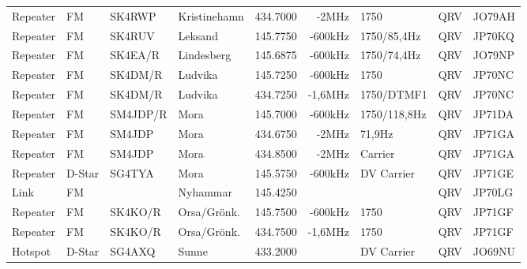 \documentclass[10pt,swedish,a4paper,twoside]{article}
\begin{document}
\begin{landscape}
\begin{longtable}{llllrrlcl}
	Repeater          & FM           & SK4RWP        & Kristinehamn        &          434.7000 &          -2MHz & 1750            &       QRV       & JO79AH           \\
	Repeater          & FM           & SK4RUV        & Leksand             &          145.7750 &        -600kHz & 1750/85,4Hz     &       QRV       & JP70KQ           \\
	Repeater          & FM           & SK4EA/R       & Lindesberg          &          145.6875 &        -600kHz & 1750/74,4Hz     &       QRV       & JO79NP           \\
	Repeater          & FM           & SK4DM/R       & Ludvika             &          145.7250 &        -600kHz & 1750            &       QRV       & JP70NC           \\
	Repeater          & FM           & SK4DM/R       & Ludvika             &          434.7250 &        -1,6MHz & 1750/DTMF1      &       QRV       & JP70NC           \\
	Repeater          & FM           & SM4JDP/R      & Mora                &          145.7000 &        -600kHz & 1750/118,8Hz    &       QRV       & JP71DA           \\
	Repeater          & FM           & SM4JDP        & Mora                &          434.6750 &          -2MHz & 71,9Hz          &       QRV       & JP71GA           \\
	Repeater          & FM           & SM4JDP        & Mora                &          434.8500 &          -2MHz & Carrier         &       QRV       & JP71GA           \\
	Repeater          & D-Star       & SG4TYA        & Mora                &          145.5750 &        -600kHz & DV Carrier      &       QRV       & JP71GE           \\
	Link              & FM           &               & Nyhammar            &          145.4250 &                &                 &       QRV       & JP70LG           \\
	Repeater          & FM           & SK4KO/R       & Orsa/Grönk.         &          145.7500 &        -600kHz & 1750            &       QRV       & JP71GF           \\
	Repeater          & FM           & SK4KO/R       & Orsa/Grönk.         &          434.7500 &        -1,6MHz & 1750            &       QRV       & JP71GF           \\
	Hotspot           & D-Star       & SG4AXQ        & Sunne               &          433.2000 &                & DV Carrier      &       QRV       & JO69NU           \\

\end{longtable}
\end{landscape}
\end{document}
